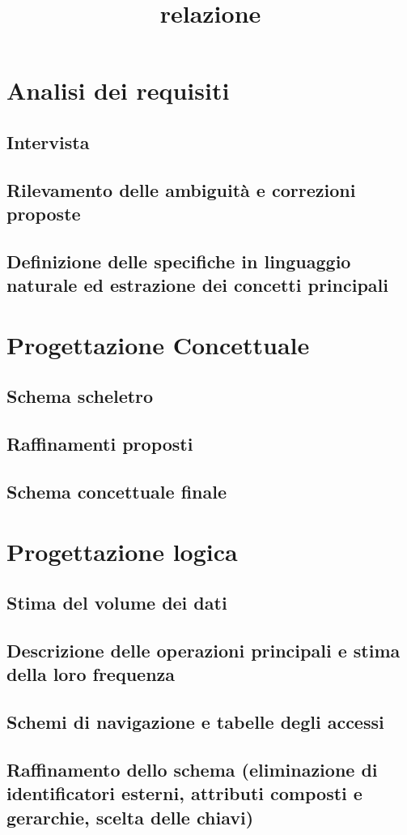 \documentclass[a4paper,12pt]{report}
\begin{document}
\title{relazione}

\chapter{Analisi dei requisiti}
\section{Intervista}
\section{Rilevamento delle ambiguità e correzioni proposte}
\section{Definizione delle specifiche in linguaggio naturale ed estrazione dei concetti principali}
\chapter{Progettazione Concettuale}
\section{Schema scheletro}
\section{Raffinamenti proposti}
\section{Schema concettuale finale}
\chapter{Progettazione logica}
\section{Stima del volume dei dati}
\section{Descrizione delle operazioni principali e stima della loro frequenza}
\section{Schemi di navigazione e tabelle degli accessi}
\section{Raffinamento dello schema (eliminazione di identificatori esterni, attributi composti e gerarchie, scelta delle chiavi)}
\end{document}
